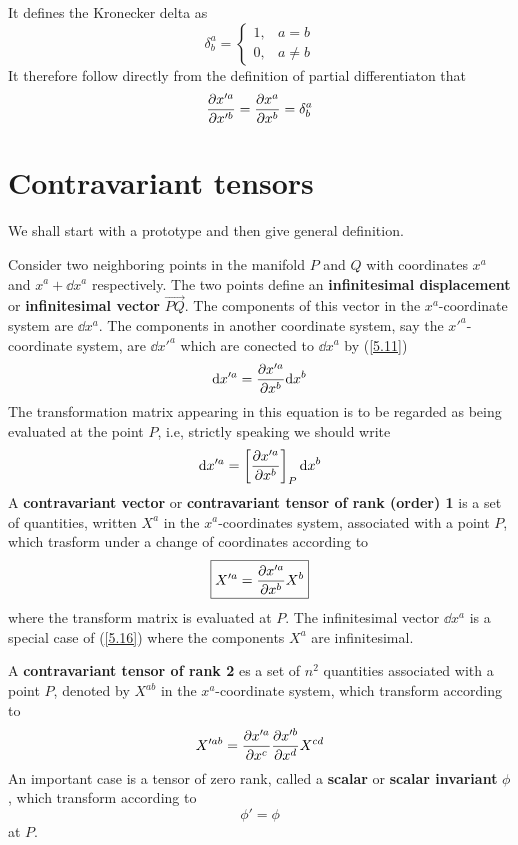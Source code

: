 It defines the Kronecker delta as
\begin{equation}
  \delta_b^{a}=\left\{ \begin{array}{lc}
    1 ,& a=b\\
  0 ,& a\neq b\end{array}\right.
\end{equation}
It therefore follow directly from the definition of partial differentiaton that
\begin{equation}                                \label{5.13}
  \pdv{x'^{a}}{x'^b}=\pdv{x^{a}}{x^b}=\delta_b^{a}
\end{equation}

\section{Contravariant tensors}\label{sec:5.5}
We shall start with a prototype and then give general definition.

Consider two neighboring points in the manifold $P$ and $Q$ with coordinates $x^{a}$ and $x^{a}+\dd x^{a}$  respectively. The two points define an \textbf{infinitesimal displacement} or \textbf{infinitesimal vector} $\overrightarrow{PQ}$. The components of this vector in the $x^{a}$-coordinate system are $\dd x^{a}$. The components in another coordinate system, say the $x'^{a}$-coordinate system, are $\dd x'^{a}$ which are conected to $\dd x^{a}$ by (\ref{5.11})
\begin{equation}\label{4.14}
  \dd x'^{a}=\pdv{x'^{a}}{x^b}\dd x^b
\end{equation}
The transformation matrix appearing in this equation is to be regarded as being evaluated at the point $P$, i.e, strictly speaking we should write 
\begin{equation}\label{5.15}
  \dd x'^{a}=\left[\pdv{x'^{a}}{x^b}\right]_P\dd x^b 
\end{equation}
A \textbf{contravariant vector} or \textbf{contravariant tensor of rank (order) 1} is a set of quantities, written $X^{a}$ in the $x^{a}$-coordinates system, associated with a point $P$, which trasform under a change of coordinates according to
\begin{equation}\label{5.16}
  \boxed{X'^{a}=\pdv{x'^{a}}{x^b}X^b }
\end{equation}
where the transform matrix is evaluated at $P$. The infinitesimal vector $\dd x^{a}$ is a special case of (\ref{5.16}) where the components $X^{a}$ are infinitesimal. 

A \textbf{contravariant tensor of rank 2} es a set of $n^2$ quantities associated with a point $P$, denoted by $X^{ab}$ in the $x^{a}$-coordinate system, which transform according to 
\begin{equation}\label{5.17}
  X'^{ab}=\pdv{x'^{a}}{x^c}\pdv{x'^b}{x^d}X^{cd }
\end{equation}
An important case is a tensor of zero rank, called a \textbf{scalar} or \textbf{scalar invariant} $\phi$, which transform according to 
\begin{equation}\label{5.18}
  \boxed{\phi' =\phi}
\end{equation}
at $P$.

